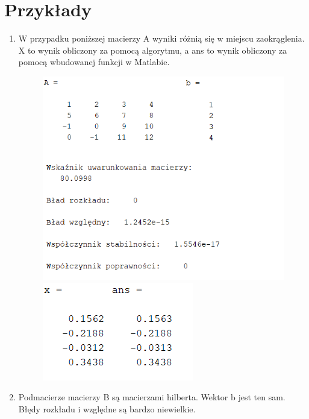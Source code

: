 \documentclass[11pt]{article}
\begin{document}
\section{Przykłady}
\begin{enumerate}

    \item W przypadku poniższej macierzy A wyniki różnią się w miejscu zaokrąglenia. X to wynik obliczony za pomocą algorytmu, a ans to wynik obliczony za pomocą wbudowanej funkcji w Matlabie.
    
    \begin{figure}[h]
        \centering
        \includegraphics[scale=0.8]{A1}
        \includegraphics[scale=0.9]{A2}
    \end{figure}


    \item Podmacierze macierzy B są macierzami hilberta. Wektor b jest ten sam. Błędy rozkładu i względne są bardzo niewielkie.


\end{enumerate}
\end{document}
